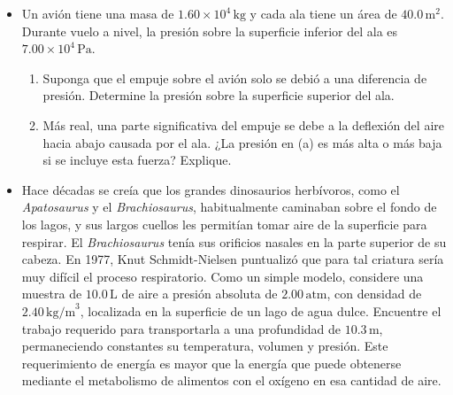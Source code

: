 \documentclass[11pt,a4paper]{article}
\begin{document}
\newpage

\begin{itemize}
    \item[\textbf{9.}] Un avión tiene una masa de \(1.60 \times 10^4\,\text{kg}\) y cada ala tiene un área de \(40.0\,\text{m}^2\). Durante vuelo a nivel, la presión sobre la superficie inferior del ala es \(7.00 \times 10^4\,\text{Pa}\).
    \begin{enumerate}
        \item[\textbf{(a)}] Suponga que el empuje sobre el avión solo se debió a una diferencia de presión. Determine la presión sobre la superficie superior del ala.
        \item[\textbf{(b)}] Más real, una parte significativa del empuje se debe a la deflexión del aire hacia abajo causada por el ala. ¿La presión en (a) es más alta o más baja si se incluye esta fuerza? Explique.
    \end{enumerate}
    \vspace*{7cm}
    
    \item[\textbf{10.}] Hace décadas se creía que los grandes dinosaurios herbívoros, como el \textit{Apatosaurus} y el \textit{Brachiosaurus}, habitualmente caminaban sobre el fondo de los lagos, y sus largos cuellos les permitían tomar aire de la superficie para respirar. El \textit{Brachiosaurus} tenía sus orificios nasales en la parte superior de su cabeza. En 1977, Knut Schmidt-Nielsen puntualizó que para tal criatura sería muy difícil el proceso respiratorio. Como un simple modelo, considere una muestra de \(10.0\,\text{L}\) de aire a presión absoluta de \(2.00\,\text{atm}\), con densidad de \(2.40\,\text{kg/m}^3\), localizada en la superficie de un lago de agua dulce. Encuentre el trabajo requerido para transportarla a una profundidad de \(10.3\,\text{m}\), permaneciendo constantes su temperatura, volumen y presión. Este requerimiento de energía es mayor que la energía que puede obtenerse mediante el metabolismo de alimentos con el oxígeno en esa cantidad de aire.
    \vspace*{8cm}
\end{itemize}
\end{document}
